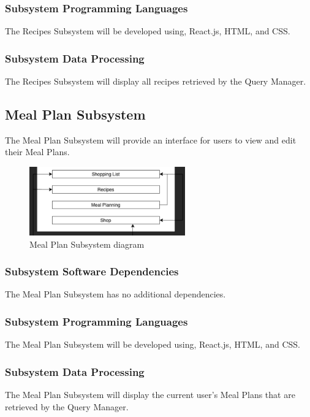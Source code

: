 \subsubsection{Subsystem Programming Languages}
The Recipes Subsystem will be developed using, React.js, HTML, and CSS.

\subsubsection{Subsystem Data Processing}
The Recipes Subsystem will display all recipes retrieved by the Query Manager.

\subsection{Meal Plan Subsystem}
The Meal Plan Subsystem will provide an interface for users to view and edit their Meal Plans.

\begin{figure}[h!]
	\centering
 	\includegraphics[width=0.60\textwidth]{images/shoppingList}
 \caption{Meal Plan Subsystem diagram}
\end{figure}

\subsubsection{Subsystem Software Dependencies}
The Meal Plan Subsystem has no additional dependencies.

\subsubsection{Subsystem Programming Languages}
The Meal Plan Subsystem will be developed using, React.js, HTML, and CSS.

\subsubsection{Subsystem Data Processing}
The Meal Plan Subsystem will display the current user's Meal Plans that are retrieved by the Query Manager.

